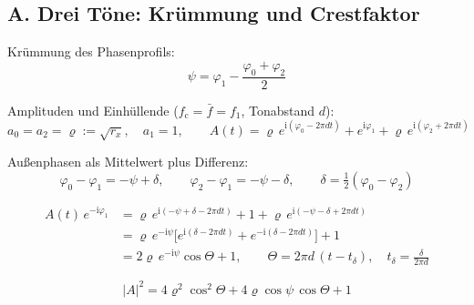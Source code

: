 
\subsection*{A. Drei T\"one: Kr\"ummung und Crestfaktor}

Kr\"ummung des Phasenprofils:
\begin{equation}
  \psi = \varphi_1 - \frac{\varphi_0+\varphi_2}{2}
  \label{eq:cf-psi}
\end{equation}

Amplituden und Einh\"ullende ($f_\mathrm{c}=\bar f=f_1$, Tonabstand $d$):
\begin{equation}
  a_0=a_2=\varrho:=\sqrt{r_x},\quad a_1=1,\qquad
  A(t) = \varrho\,e^{\mathrm{i}(\varphi_0-2\pi d t)} + e^{\mathrm{i}\varphi_1}
       + \varrho\,e^{\mathrm{i}(\varphi_2+2\pi d t)}
\end{equation}

Au\ss{}enphasen als Mittelwert plus Differenz:
\begin{equation}
  \varphi_0-\varphi_1 = -\psi+\delta,\qquad
  \varphi_2-\varphi_1 = -\psi-\delta,\qquad
  \delta = \tfrac12(\varphi_0-\varphi_2)
\end{equation}

\begin{align}
  A(t)\,e^{-\mathrm{i}\varphi_1}
  &= \varrho\,e^{\mathrm{i}(-\psi+\delta-2\pi d t)} + 1
   + \varrho\,e^{\mathrm{i}(-\psi-\delta+2\pi d t)}\\
  &= \varrho\,e^{-\mathrm{i}\psi}\Big[e^{\mathrm{i}(\delta-2\pi d t)}
   + e^{-\mathrm{i}(\delta-2\pi d t)}\Big] + 1\\
  &= 2\varrho\,e^{-\mathrm{i}\psi}\cos\Theta + 1,
  \qquad \Theta = 2\pi d\,(t-t_\delta),\quad t_\delta = \frac{\delta}{2\pi d}
\end{align}

\begin{equation}
  |A|^2 = 4\varrho^2\cos^2\Theta + 4\varrho\cos\psi\,\cos\Theta + 1
\end{equation}

